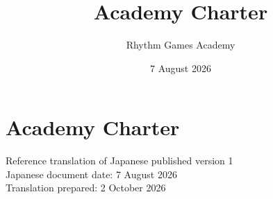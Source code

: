 \documentclass[
  report,
  fontsize   = 12pt,
  paper      = a4,
  head_space = 20mm,
  foot_space = 20mm,
  gutter     = 20mm,
  fore-edge  = 20mm
]{jlreq}
\title{Academy Charter}
\author{Rhythm Games Academy}
\date{7 August 2026}
\begin{document}
\chapter*{Academy Charter}
\begin{flushright}
Reference translation of Japanese published version 1\\
Japanese document date: 7 August 2026\\
Translation prepared: 2 October 2026
\end{flushright}
\translationnotice

\end{document}
